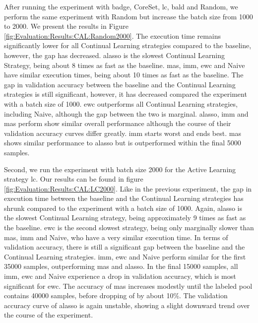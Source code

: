 After running the experiment with \gls{badge}, CoreSet, \gls{lc}, \gls{bald} and Random, we perform the same experiment with Random but increase the batch size from 1000 to 2000. We present the results in
Figure \ref{fig:Evaluation:Results:CAL:Random2000}. The execution time remains significantly lower for all Continual Learning strategies compared to the baseline, however, the gap has decreased. 
\gls{alasso} is the slowest Continual Learning Strategy, being about 8 times as fast as the baseline. \gls{mas}, \gls{imm}, \gls{ewc} and Naive have similar execution times, being about 10 times as fast as the baseline. 
The gap in validation accuracy between the baseline and the Continual Learning strategies is still significant, however, it has decreased compared the experiment with a batch size of 1000.
\gls{ewc} outperforms all Continual Learning strategies, including Naive, although the gap between the two is marginal. \gls{alasso}, \gls{imm} and \gls{mas} perform show similar overall performance although the course
of their validation accuracy curves differ greatly. \gls{imm} starts worst and ends best. \gls{mas} shows similar performance to \gls{alasso} but is outperformed within the final 5000 samples. \par


Second, we run the experiment with batch size 2000 for the Active Learning strategy \gls{lc}. Our results can be found in figure \ref{fig:Evaluation:Results:CAL:LC2000}. Like in the previous experiment,
the gap in execution time between the baseline and the Continual Learning strategies has shrunk compared to the experiment with a batch size of 1000. Again, \gls{alasso} is the slowest Continual Learning
strategy, being approximately 9 times as fast as the baseline. \gls{ewc} is the second slowest strategy, being only marginally slower than \gls{mas}, \gls{imm} and Naive, who have a very similar execution time.
In terms of validation accuracy, there is still a significant gap between the baseline and the Continual Learning strategies. \gls{imm}, \gls{ewc} and Naive perform similar for the first 35000 samples, outperforming
\gls{mas} and \gls{alasso}. In the final 15000 samples, all \gls{imm}, \gls{ewc} and Naive experience a drop in validation accuracy, which is most significant for \gls{ewc}. The accuracy of \gls{mas} increases modestly until the labeled
pool contains 40000 samples, before dropping of by about 10\%. The validation accuracy curve of \gls{alasso} is again unstable, showing a slight downward trend over the course of the experiment. \par


